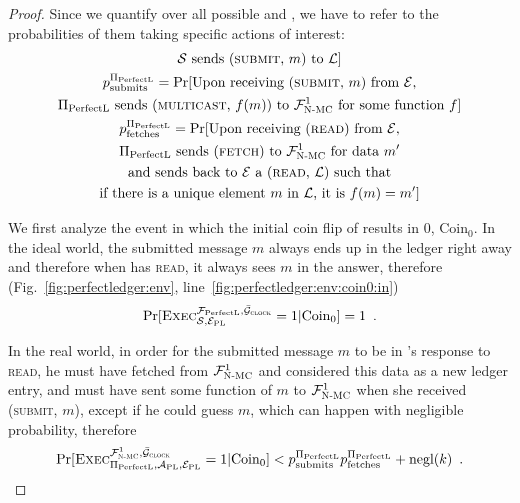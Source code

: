 \begin{proof}
    Since we quantify over all possible \simulator{} and \perfectprot, we have
    to refer to the probabilities of them taking specific actions of interest:
    \begin{gather*}
      \text{\ensuremath{\mathcal{S}}{} sends (\textsc{submit}, $m$) to $\mathcal{L}$}] \\
      p^{\Pi_{\mathrm{PerfectL}}}_{\mathrm{submits}} = \Pr[\text{Upon receiving (\textsc{submit}, $m$) from
      \ensuremath{\mathcal{E}},} \\
      \text{\ensuremath{\Pi_{\mathrm{PerfectL}}}{} sends (\textsc{multicast}, $f(m)$) to
      $\mathcal{F}_{\textsc{N-MC}}^1$ for some function $f$}]
      \\
      p^{\Pi_{\mathrm{PerfectL}}}_{\mathrm{fetches}} = \Pr[\text{Upon receiving (\textsc{read}) from \ensuremath{\mathcal{E}},}
      \\
      \text{\ensuremath{\Pi_{\mathrm{PerfectL}}}{} sends (\textsc{fetch}) to $\mathcal{F}_{\textsc{N-MC}}^1$ for data }
      m' \\
      \text{and sends back to \ensuremath{\mathcal{E}}{} a (\textsc{read}, $\mathcal{L}$)
      such that} \\
      \text{if there is a unique element $m$ in $\mathcal{L}$, it is } f(m) =
      m']
    \end{gather*}

    We first analyze the event in which the initial coin flip of \environment{}
    results in 0, $\mathrm{Coin}_0$. In the ideal world, the submitted message
    $m$ always ends up in the ledger right away and therefore when
    \environment{} has \bob{} \textsc{read}, it always sees $m$ in the answer,
    therefore (Fig.~\ref{fig:perfectledger:env},
    line~\ref{fig:perfectledger:env:coin0:in})
    \begin{equation*}
      \Pr[\textsc{Exec}^{\mathcal{F}_{\mathrm{PerfectL}}, \bar{\mathcal{G}}_{\textsc{clock}}}_{\mathcal{S}, \mathcal{E}_{\mathrm{PL}}} = 1
      | \mathrm{Coin}_0] = 1 \enspace.
    \end{equation*}

    In the real world, in order for the submitted message $m$ to be in \bob's
    response to \textsc{read}, he must have fetched from $\mathcal{F}_{\textsc{N-MC}}^1$ and
    considered this data as a new ledger entry, and \alice{} must have sent some
    function of $m$ to $\mathcal{F}_{\textsc{N-MC}}^1$ when she received (\textsc{submit}, $m$),
    except if he could guess $m$, which can happen with negligible probability,
    therefore
    \begin{equation*}
      \Pr[\textsc{Exec}^{\mathcal{F}_{\textsc{N-MC}}^1, \bar{\mathcal{G}}_{\textsc{clock}}}_{\Pi_{\mathrm{PerfectL}}, \mathcal{A}_{\mathrm{PL}},
      \mathcal{E}_{\mathrm{PL}}} = 1 | \mathrm{Coin}_0] < p^{\Pi_{\mathrm{PerfectL}}}_{\mathrm{submits}} p^{\Pi_{\mathrm{PerfectL}}}_{\mathrm{fetches}} + \text{negl}(k)
      \enspace.
    \end{equation*}


\end{proof}
